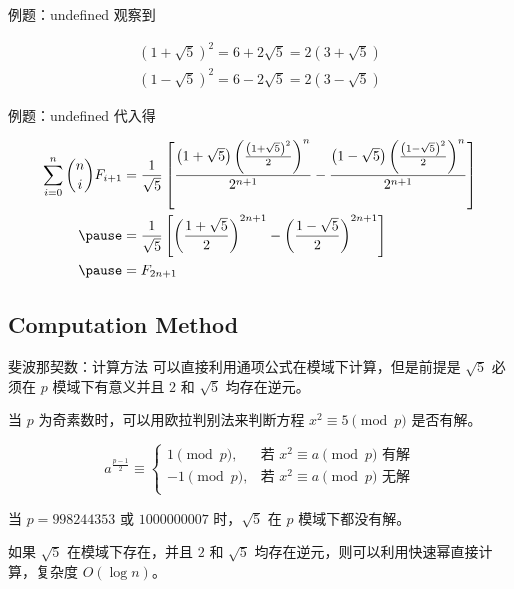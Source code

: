 \documentclass[12pt,aspectratio=169]{beamer}
\begin{document}
\begin{frame}[fragile]{例题：undefined}
观察到

$$
\begin{aligned}
\left(1+\sqrt{5}\right)^2 = 6 + 2\sqrt{5} = 2\left(3 + \sqrt{5}\right) \\
\left(1-\sqrt{5}\right)^2 = 6 - 2\sqrt{5} = 2\left(3 - \sqrt{5}\right)
\end{aligned}
$$
\end{frame}

\begin{frame}[fragile]{例题：undefined}
代入得

$$
\begin{aligned}
\sum_{i=0}^n {n \choose i} F_{i+1} &= \frac{1}{\sqrt{5}} \left[\frac{\left(1+\sqrt{5}\right)\left(\frac{\left(1+\sqrt{5}\right)^2}{2}\right)^n}{2^{n+1}}-\frac{\left(1-\sqrt{5}\right)\left(\frac{\left(1-\sqrt{5}\right)^2}{2}\right)^n}{2^{n+1}}\right] \\ \pause
&= \frac{1}{\sqrt{5}} \left[\left(\frac{1+\sqrt{5}}{2}\right)^{2n+1}-\left(\frac{1-\sqrt{5}}{2}\right)^{2n+1}\right] \\ \pause
&= F_{2n+1}
\end{aligned}
$$
\end{frame}

\subsection[计算方法]{Computation Method}

\begin{frame}[fragile]{斐波那契数：计算方法}
可以直接利用通项公式在模域下计算，但是前提是 $\sqrt{5}$ 必须在 $p$ 模域下有意义并且 $2$ 和 $\sqrt{5}$ 均存在逆元。

当 $p$ 为奇素数时，可以用欧拉判别法来判断方程 $x^2 \equiv 5 \pmod p$ 是否有解。

$$
a^{\frac{p-1}{2}} \equiv \begin{cases}
  1 \pmod p, & \text{若 } x^2 \equiv a \pmod p \text{ 有解} \\
 -1 \pmod p, & \text{若 } x^2 \equiv a \pmod p \text{ 无解} \\
\end{cases}
$$

当 $p = 998244353$ 或 $1000000007$ 时，$\sqrt{5}$ 在 $p$ 模域下都没有解。

如果 $\sqrt{5}$ 在模域下存在，并且 $2$ 和 $\sqrt{5}$ 均存在逆元，则可以利用快速幂直接计算，复杂度 $O(\log n)$。
\end{frame}
\end{document}
